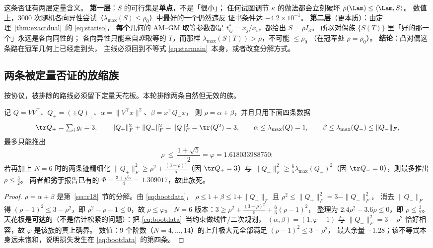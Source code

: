 \begin{remark}[否证的定量内容]\label{rmk:p1dead}
这条否证有两层定量含义。
\textbf{第一层}：$S$ 的可行集是\textbf{单点}，不是「很小」；
任何试图调节 $\kappa$ 的做法都会立刻破坏 $\rho(\Lam)\le\langle\Lam,S\rangle$。
数值上，$3000$ 次随机各向异性尝试（$\lambda_{\max}(S)\le\rho_0$）中最好的一个仍然违反
证书条件达 $-4.2\times10^{-1}$。
\textbf{第二层}（更本质）：由定理~\ref{thm:exactdual}~的 \eqref{eq:stariso}，
\textbf{每个}几何的 AM--GM 取等参数都是 $t^*_{ij}=x_j/x_i$，都给出 $S=\rho I_3$。
所以对偶族 $\{S(T)\}$ 里「好的那一个」永远是各向同性的；
各向异性只能来自\emph{非}取等的 $T$，而那样 $\lambda_{\max}(S(T))>\rho$，不可能 $\le\rho_0$
（在冠军处 $\rho=\rho_0$）。
\textbf{结论}：凸对偶这条路在冠军几何上已经走到头，
主线必须回到不等式 \eqref{eq:starmain}~本身，或者改变分解方式。
\end{remark}

\subsection{两条被定量否证的放缩族}\label{sec:r19:ceil}

按协议，被排除的路线必须留下定量天花板。本轮排除两条自然但无效的族。

\begin{proposition}\label{prop:ceilweyl}
记 $Q=VV^\top$、$Q_\pm=(\pm Q)_+$、$\alpha=\|V^\top x\|^2$、$\beta=x^\top Q_-x$，
则 $\rho=\alpha+\beta$，并且只用下面四条数据
\begin{equation}\label{eq:bootdata}
\tr Q_+=\textstyle\sum_ig_i=3,\qquad
\|Q_+\|_F^2+\|Q_-\|_F^2=\|Q\|_F^2=\tr(Q^2)=3,\qquad
\alpha\le\lambda_{\max}(Q)=1,\qquad \beta\le\lambda_{\max}(Q_-)\le\|Q_-\|_F ,
\end{equation}
最多只能推出
\begin{equation}\label{eq:boot}
\rho\ \le\ \frac{1+\sqrt5}{2}=\varphi=1.618033988750 ;
\end{equation}
若再加上 $N=6$ 时的两条迹精细化
$\|Q_+\|_F^2\ge\rho^2+\frac{(3-\rho)^2}{5}$（因 $\tr Q_+=3$）与
$\|Q_-\|_F^2\ge\frac65\lambda_{\max}(Q_-)^2$（因 $\tr Q_-=0$），则最多推出 $\rho\le\frac32$。
两者都\textbf{劣于}报告已有的 $\Phi=\frac{3+\sqrt5}4=1.309017$，故此族死。
\end{proposition}

\begin{proof}
$\rho=\alpha+\beta$ 是第~\ref{sec:r18}~节的分解。由 \eqref{eq:bootdata}，
$\rho\le1+\beta\le1+\|Q_-\|_F$ 且 $\rho^2\le\|Q_+\|_F^2=3-\|Q_-\|_F^2$，
消去 $\|Q_-\|_F$ 得 $(\rho-1)^2\le3-\rho^2$，即 $\rho^2-\rho-1\le0$，故 $\rho\le\varphi$。
$N=6$ 版本：$3\ge\rho^2+\frac{(3-\rho)^2}5+\frac65(\rho-1)^2$，
整理为 $2.4\rho^2-3.6\rho\le0$，即 $\rho\le\frac32$。
天花板是\textbf{可达}的（不是估计松紧的问题）：把 \eqref{eq:bootdata}~当约束做线性/二次规划，
$(\alpha,\beta)=(1,\varphi-1)$ 与 $\|Q_-\|_F^2=3-\rho^2$ 恰好相容，故 $\varphi$ 是该族的真上确界。
数值：$9$ 个阶数（$N=4,\dots,14$）的上升极大元全部满足 $(\rho-1)^2\le3-\rho^2$，
最大余量 $-1.28$；该不等式本身远未饱和，说明损失发生在 \eqref{eq:bootdata}~的第四条。
\end{proof}

